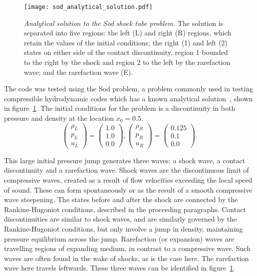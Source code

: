 \begin{figure}[t]
  \centering
  \texttt{[image: sod\_analytical\_solution.pdf]}
  \caption{\emph{Analytical solution to the Sod shock tube problem.} The solution is separated into five regions: the left (L) and right (R) regions, which retain the values of the initial conditions; the right (1) and left (2) states on either side of the contact discontinuity, region 1 bounded to the right by the shock and region 2 to the left by the rarefaction wave; and the rarefaction wave (E).}%
  \label{fig:sod_analytical_solution}
\end{figure}

The code was tested using the Sod problem, a problem commonly used in testing compressible hydrodynamic codes which has a known analytical solution~\cite{sodSurveySeveralFinite1978}, shown in figure~\ref{fig:sod_analytical_solution}. The initial conditions for the problem is a discontinuity in both pressure and density at the location $x_0=0.5$,
\begin{equation}
  \label{eq:sod_problem_ic}
\begin{pmatrix}\rho _{L}\\p_{L}\\u_{L}\end{pmatrix}
=
\begin{pmatrix}1.0\\1.0\\0.0\end{pmatrix},
\begin{pmatrix}\rho _{R}\\p_{R}\\u_{R}\end{pmatrix}
=
\begin{pmatrix}0.125\\0.1\\0.0\end{pmatrix}.
\end{equation}

This large initial pressure jump generates three waves: a shock wave, a contact discontinuity and a rarefaction wave. Shock waves are the discontinuous limit of compressive waves, created as a result of flow velocities exceeding the local speed of sound. These can form spontaneously or as the result of a smooth compressive wave steepening. The states before and after the shock are connected by the Rankine-Hugoniot conditions, described in the proceeding paragraphs. Contact discontinuities are similar to shock waves, and are similarly governed by the Rankine-Hugoniot conditions, but only involve a jump in density, maintaining pressure equilibrium across the jump. Rarefaction (or expansion) waves are travelling regions of expanding medium, in contrast to a compressive wave. Such waves are often found in the wake of shocks, as is the case here. The rarefaction wave here travels leftwards. These three waves can be identified in figure~\ref{fig:sod_analytical_solution}.

